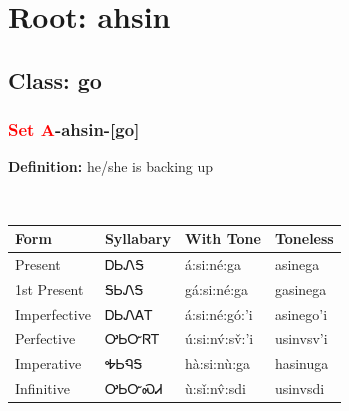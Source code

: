 \needspace{4in}
\section*{Root: ahsin}
\nopagebreak
{}
\needspace{3in}
\subsection*{Class: go}
\nopagebreak
\needspace{2in}
\subsubsection*{\textcolor{Red}{Set A}{-}\textbf{ahsin}{-}[go]}
\nopagebreak
\textbf{Definition: } he/she is backing up
\\[0.5em]
\begin{tabularx}{\textwidth}{l X X X}%
\toprule%
\textbf{Form}&\textbf{Syllabary}&\textbf{With Tone}&\textbf{Toneless}\\%
\midrule%
Present&ᎠᏏᏁᎦ&á:si:né:ga&asinega\\%
1st Present&ᎦᏏᏁᎦ&gá:si:né:ga&gasinega\\%
Imperfective&ᎠᏏᏁᎪᎢ&á:si:né:gó:’i&asinego’i\\%
Perfective&ᎤᏏᏅᏒᎢ&ú:si:nv́:sv̌:’i&usinvsv’i\\%
Imperative&ᎭᏏᏄᎦ&hà:si:nù:ga&hasinuga\\%
Infinitive&ᎤᏏᏅᏍᏗ&ù:sǐ:nv̂:sdi&usinvsdi\\%
\bottomrule%
\end{tabularx}
\\[1em]